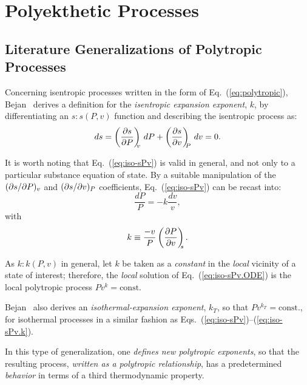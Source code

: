 \section{Polyekthetic Processes}

    \subsection{Literature Generalizations of Polytropic Processes}

    Concerning  isentropic  processes  written  in  the   form   of   Eq.~(\ref{eq:polytropic}),
    Bejan~\cite{2006-BejanA-Wiley} derives  a  definition  for  the  \emph{isentropic  expansion
    exponent}, $k$, by differentiating an $s\!:\!s(P, v)$ function and describing the isentropic
    process as:
    \begin{equation}
        ds = \left(\frac{\partial {{s}}}{\partial {{P}}}\right)_{\!\!\!{v}}\,dP + \left(\frac{\partial {{s}}}{\partial {{v}}}\right)_{\!\!\!{P}}\,dv = 0.
        \label{eq:iso-sPv}
    \end{equation}

    It is worth noting that Eq.~(\ref{eq:iso-sPv}) is valid  in  general,  and  not  only  to  a
    particular substance equation of state. By a suitable manipulation of the $({\partial {{s}}}/{\partial {{P}}})_{{v}}$  and
    $({\partial {{s}}}/{\partial {{v}}})_{{P}}$ coefficients, Eq.~(\ref{eq:iso-sPv}) can be recast into:
    \begin{equation}
        \frac{dP}{P} = -k\frac{dv}{v},
        \label{eq:iso-sPv.ODE}
    \end{equation}
    \noindent with
    \begin{equation}
        k \equiv \frac{-v}{P}\left(\frac{\partial {{P}}}{\partial {{v}}}\right)_{\!\!\!{s}}.
        \label{eq:iso-sPv.k}
    \end{equation}

    As $k\!:\!k(P, v)$ in general, let $k$ be taken as a  \emph{constant}  in  the  \emph{local}
    vicinity   of   a   state   of   interest;   therefore,   the   \emph{local}   solution   of
    Eq.~(\ref{eq:iso-sPv.ODE}) is the local polytropic process $Pv^k = \mbox{const.}$

    Bejan~\cite{2006-BejanA-Wiley} also derives an \emph{isothermal-expansion exponent},  $k_T$,
    so that $Pv^{k_T} = \mbox{const.}$,  for  isothermal  processes  in  a  similar  fashion  as
    Eqs.~(\ref{eq:iso-sPv})--(\ref{eq:iso-sPv.k}).

    In this type of generalization, one \emph{defines new polytropic  exponents},  so  that  the
    resulting  process,  \emph{written  as  a  polytropic  relationship},  has  a  predetermined
    \emph{behavior} in terms of a third thermodynamic property.

